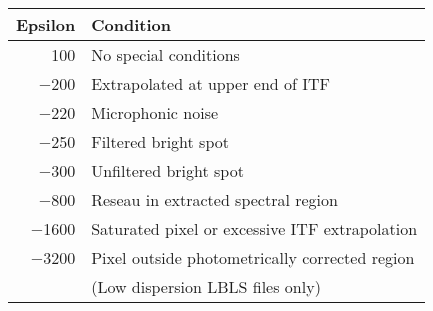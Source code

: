 \begin{center}
\begin{tabular}{|rl|} \hline
Epsilon& Condition\\ \hline
100&No special conditions\\
$-$200&Extrapolated at upper end of ITF\\
$-$220&Microphonic noise\\
$-$250&Filtered bright spot\\
$-$300&Unfiltered bright spot\\
$-$800&Reseau in extracted spectral region\\
$-$1600&Saturated pixel or excessive ITF extrapolation\\
$-$3200&Pixel outside photometrically corrected region\\
&(Low dispersion LBLS files only) \\ \hline
\end{tabular}
\end{center}

